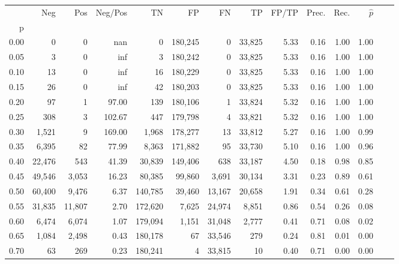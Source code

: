\begin{tabular}{rrrrrrrrrrrrrr}
\toprule
{} &     Neg &     Pos & Neg/Pos &       TN &       FP &      FN &      TP & FP/TP & Prec. &  Rec. & $\hat{p}$ \\
p    &         &         &         &          &          &         &         &       &       &       &           \\
\midrule
0.00 &       0 &       0 &     nan &        0 &  180,245 &       0 &  33,825 &  5.33 &  0.16 &  1.00 &      1.00 \\
0.05 &       3 &       0 &     inf &        3 &  180,242 &       0 &  33,825 &  5.33 &  0.16 &  1.00 &      1.00 \\
0.10 &      13 &       0 &     inf &       16 &  180,229 &       0 &  33,825 &  5.33 &  0.16 &  1.00 &      1.00 \\
0.15 &      26 &       0 &     inf &       42 &  180,203 &       0 &  33,825 &  5.33 &  0.16 &  1.00 &      1.00 \\
0.20 &      97 &       1 &   97.00 &      139 &  180,106 &       1 &  33,824 &  5.32 &  0.16 &  1.00 &      1.00 \\
0.25 &     308 &       3 &  102.67 &      447 &  179,798 &       4 &  33,821 &  5.32 &  0.16 &  1.00 &      1.00 \\
0.30 &   1,521 &       9 &  169.00 &    1,968 &  178,277 &      13 &  33,812 &  5.27 &  0.16 &  1.00 &      0.99 \\
0.35 &   6,395 &      82 &   77.99 &    8,363 &  171,882 &      95 &  33,730 &  5.10 &  0.16 &  1.00 &      0.96 \\
0.40 &  22,476 &     543 &   41.39 &   30,839 &  149,406 &     638 &  33,187 &  4.50 &  0.18 &  0.98 &      0.85 \\
0.45 &  49,546 &   3,053 &   16.23 &   80,385 &   99,860 &   3,691 &  30,134 &  3.31 &  0.23 &  0.89 &      0.61 \\
0.50 &  60,400 &   9,476 &    6.37 &  140,785 &   39,460 &  13,167 &  20,658 &  1.91 &  0.34 &  0.61 &      0.28 \\
0.55 &  31,835 &  11,807 &    2.70 &  172,620 &    7,625 &  24,974 &   8,851 &  0.86 &  0.54 &  0.26 &      0.08 \\
0.60 &   6,474 &   6,074 &    1.07 &  179,094 &    1,151 &  31,048 &   2,777 &  0.41 &  0.71 &  0.08 &      0.02 \\
0.65 &   1,084 &   2,498 &    0.43 &  180,178 &       67 &  33,546 &     279 &  0.24 &  0.81 &  0.01 &      0.00 \\
0.70 &      63 &     269 &    0.23 &  180,241 &        4 &  33,815 &      10 &  0.40 &  0.71 &  0.00 &      0.00 \\

\end{tabular}
